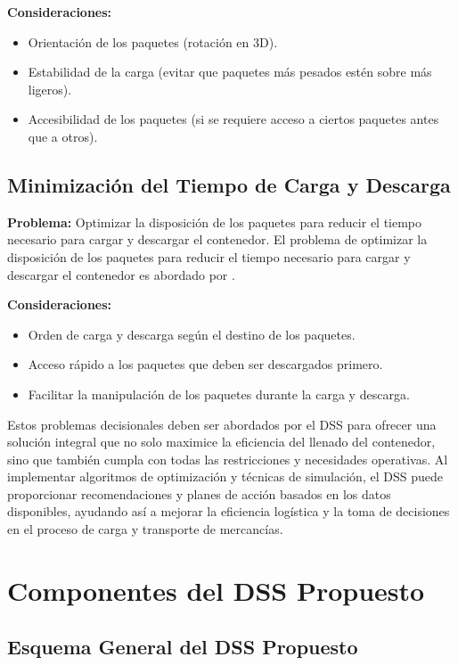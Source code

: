 \documentclass[9pt,a4paper]{rho}
\begin{document}
\textbf{Consideraciones:}
\begin{itemize}
    \item Orientación de los paquetes (rotación en 3D).
    \item Estabilidad de la carga (evitar que paquetes más pesados estén sobre más ligeros).
    \item Accesibilidad de los paquetes (si se requiere acceso a ciertos paquetes antes que a otros).
\end{itemize}

\subsection{Minimización del Tiempo de Carga y Descarga}

\textbf{Problema:} Optimizar la disposición de los paquetes para reducir el tiempo necesario para cargar y descargar el contenedor. El problema de optimizar la disposición de los paquetes para reducir el tiempo necesario para cargar y descargar el contenedor es abordado por \textcite{bastidas}.

\textbf{Consideraciones:}
\begin{itemize}
    \item Orden de carga y descarga según el destino de los paquetes.
    \item Acceso rápido a los paquetes que deben ser descargados primero.
    \item Facilitar la manipulación de los paquetes durante la carga y descarga.
\end{itemize}

Estos problemas decisionales deben ser abordados por el DSS para ofrecer una solución integral que no solo maximice la eficiencia del llenado del contenedor, sino que también cumpla con todas las restricciones y necesidades operativas. Al implementar algoritmos de optimización y técnicas de simulación, el DSS puede proporcionar recomendaciones y planes de acción basados en los datos disponibles, ayudando así a mejorar la eficiencia logística y la toma de decisiones en el proceso de carga y transporte de mercancías.

\section{Componentes del DSS Propuesto}

\subsection{Esquema General del DSS Propuesto}
\end{document}
